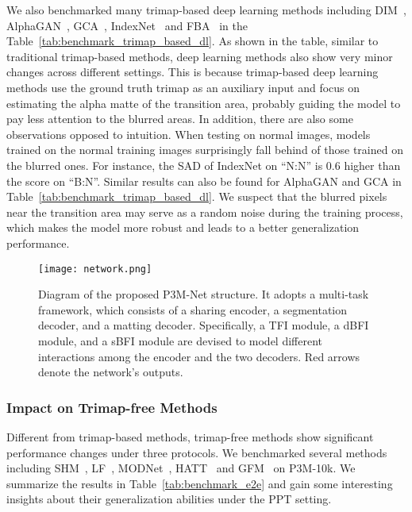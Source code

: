 \documentclass[twocolumn]{svjour3}
\begin{document}
We also benchmarked many trimap-based deep learning methods including DIM~\citep{dim}, AlphaGAN~\citep{bmvcLutzAS18}, GCA~\citep{li2020natural}, IndexNet~\citep{lu2019indices} and FBA~\citep{forte2020fbamatting} in the Table~\ref{tab:benchmark_trimap_based_dl}. As shown in the table, similar to traditional trimap-based methods, deep learning methods also show very minor changes across different settings. This is because trimap-based deep learning methods use the ground truth trimap as an auxiliary input and focus on estimating the alpha matte of the transition area, probably guiding the model to pay less attention to the blurred areas. In addition, there are also some observations opposed to intuition. When testing on normal images, models trained on the normal training images surprisingly fall behind of those trained on the blurred ones. For instance, the SAD of IndexNet on ``N:N'' is 0.6 higher than the score on ``B:N''. Similar results can also be found for AlphaGAN and GCA in Table~\ref{tab:benchmark_trimap_based_dl}.
We suspect that the blurred pixels near the transition area may serve as a random noise during the training process, which makes the model more robust and leads to a better generalization performance. 

\begin{figure*}[t]
    \centering
    \texttt{[image: network.png]}
    \caption{Diagram of the proposed P3M-Net structure. It adopts a multi-task framework, which consists of a sharing encoder, a segmentation decoder, and a matting decoder. Specifically, a TFI module, a dBFI module, and a sBFI module are devised to model different interactions among the encoder and the two decoders. Red arrows denote the network's outputs.}
    \label{fig:network}
\end{figure*}

\subsubsection{Impact on Trimap-free Methods}

Different from trimap-based methods, trimap-free methods show significant performance changes under three protocols. We benchmarked several methods including SHM~\citep{shm}, LF~\citep{lf}, MODNet~\citep{modnet}, HATT~\citep{hatt} and GFM~\citep{gfm} on P3M-10k. We summarize the results in Table~\ref{tab:benchmark_e2e} and gain some interesting insights about their generalization abilities under the PPT setting.
\end{document}
